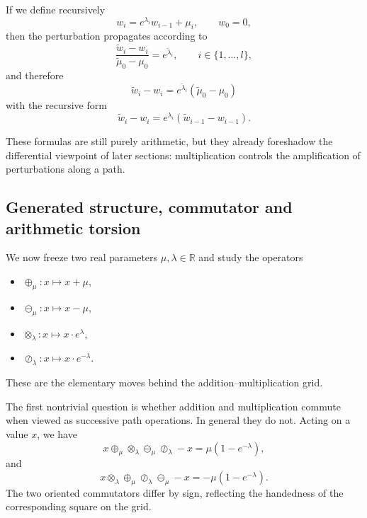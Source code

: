 If we define recursively
\[
w_i=e^{\lambda_i}w_{i-1}+\mu_i,
\qquad
w_0=0,
\]
then the perturbation propagates according to
\begin{equation}
\frac{\tilde w_i-w_i}{\tilde\mu_0-\mu_0}=e^{\check{\lambda}_i},
\qquad i\in\{1,\dots,l\},
\end{equation}
and therefore
\[
\tilde w_i-w_i=e^{\check{\lambda}_i}(\tilde\mu_0-\mu_0)
\]
with the recursive form
\begin{equation}
\tilde w_i-w_i = e^{\lambda_i}(\tilde w_{i-1}-w_{i-1}).
\label{eq:perturbation2}
\end{equation}

These formulas are still purely arithmetic, but they already foreshadow the differential viewpoint of later sections: multiplication controls the amplification of perturbations along a path.

\subsection{Generated structure, commutator and arithmetic torsion}\label{subsec:generated-structure}

We now freeze two real parameters $\mu,\lambda\in\mathbb{R}$ and study the operators
\begin{itemize}
    \item $\oplus_\mu:x\mapsto x+\mu$,
    \item $\ominus_\mu:x\mapsto x-\mu$,
    \item $\otimes_\lambda:x\mapsto x\cdot e^{\lambda}$,
    \item $\oslash_\lambda:x\mapsto x\cdot e^{-\lambda}$.
\end{itemize}
These are the elementary moves behind the addition--multiplication grid.

The first nontrivial question is whether addition and multiplication commute when viewed as successive path operations. In general they do not. Acting on a value $x$, we have
\begin{equation}
x\oplus_\mu\otimes_\lambda\ominus_\mu\oslash_\lambda - x
= \mu(1-e^{-\lambda}),
\label{eq:commutator1}
\end{equation}
and
\begin{equation}
x\otimes_\lambda\oplus_\mu\oslash_\lambda\ominus_\mu - x
= -\mu(1-e^{-\lambda}).
\label{eq:commutator2}
\end{equation}
The two oriented commutators differ by sign, reflecting the handedness of the corresponding square on the grid.


